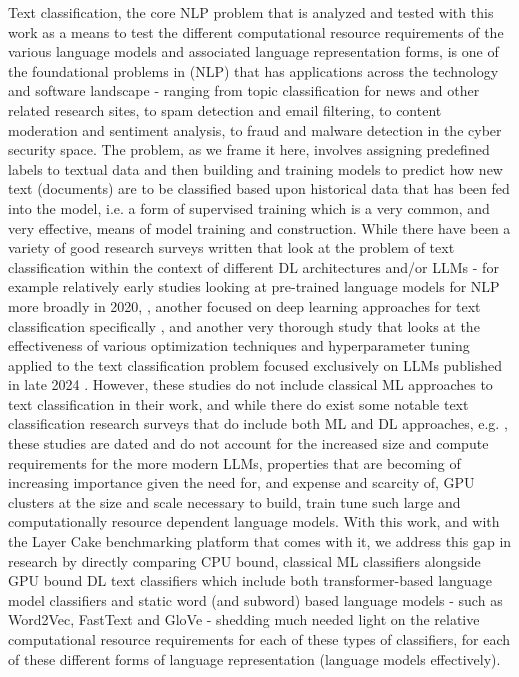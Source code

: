 \documentclass[final]{clv2025}
\begin{document}
Text classification, the core NLP problem that is analyzed and tested with this work as a means to test the different computational resource requirements of the various language models and associated language representation forms, is one of the foundational problems in (NLP) that has applications across the technology and software landscape - ranging from topic classification for news and other related research sites, to spam detection and email filtering, to content moderation and sentiment analysis, to fraud and malware detection in the cyber security space. The problem, as we frame it here, involves assigning predefined labels to textual data and then building and training models to predict how new text (documents) are to be classified based upon historical data that has been fed into the model, i.e. a form of supervised training which is a very common, and very effective, means of model training and construction. While there have been a variety of good research surveys written that look at the problem of text classification within the context of different DL architectures and/or LLMs - for example relatively early studies looking at pre-trained language models for NLP more broadly in 2020, \cite{qiu2020pre}, another focused on deep learning approaches for text classification specifically \cite{minaee2021deep}, and another very thorough study that looks at the effectiveness of various optimization techniques and hyperparameter tuning applied to the text classification problem focused exclusively on LLMs published in late 2024 \cite{trust2024study}. However, these studies do not include classical ML approaches to text classification in their work, and while there do exist some notable text classification research surveys that do include both ML and DL approaches, e.g. \cite{liu2019roberta}, these studies are dated and do not account for the increased size and compute requirements for the more modern LLMs, properties that are becoming of increasing importance given the need for, and expense and scarcity of, GPU clusters at the size and scale necessary to build, train tune such large and computationally resource dependent language models. With this work, and with the Layer Cake benchmarking platform that comes with it, we address this gap in research by directly comparing CPU bound, classical ML classifiers alongside GPU bound DL text classifiers which include both transformer-based language model classifiers and static word (and subword) based language models - such as Word2Vec, FastText and GloVe - shedding much needed light on the relative computational resource requirements for each of these types of classifiers, for each of these different forms of language representation (language models effectively).  
\end{document}
